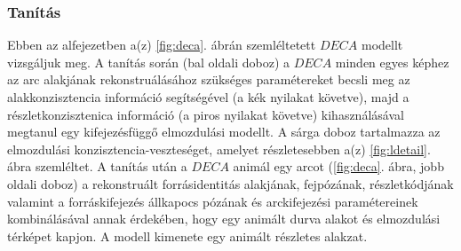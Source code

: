 \documentclass[12pt,a4]{article}
\begin{document}
            \subsubsection{Tanítás}
                Ebben az alfejezetben a(z) \ref{fig:deca}. ábrán szemléltetett $DECA$ modellt vizsgáljuk meg.
     	          A tanítás során (bal oldali doboz) a $DECA$ minden egyes képhez
     	          az arc alakjának rekonstruálásához szükséges paramétereket becsli meg az
     	          alakkonzisztencia információ segítségével (a kék nyilakat követve), majd
     	          a részletkonzisztenica információ (a piros nyilakat követve) kihasználásával
     	          megtanul egy kifejezésfüggő elmozdulási modellt. A sárga doboz tartalmazza
     	          az elmozdulási konzisztencia-veszteséget, amelyet részletesebben
                a(z) \ref{fig:ldetail}. ábra szemléltet.
     	          A tanítás után a $DECA$ animál egy arcot (\ref{fig:deca}. ábra, 
                jobb oldali doboz) a rekonstruált forrásidentitás alakjának, fejpózának, részletkódjának valamint a forráskifejezés állkapocs pózának és arckifejezési paramétereinek kombinálásával annak érdekében, hogy egy animált durva alakot és elmozdulási térképet kapjon. A modell kimenete egy animált
     	          részletes alakzat.
\end{document}
